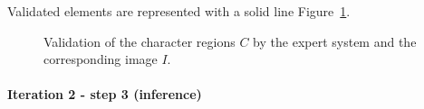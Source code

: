 
Validated elements are represented with a solid line Figure~\ref{fig:kn:valid_2}.


 \begin{figure}[!ht]  %
   \centering
   \hspace{0.5em}
  \caption[Validation of the character regions by the expert system]{Validation of the character regions $C$ by the expert system and the corresponding image $I$.
  }
  \label{fig:kn:valid_2}
 \end{figure}

\paragraph{Iteration 2 - step 3 (inference)} %
\label{par:step_6}


